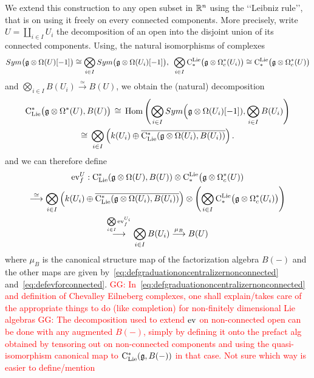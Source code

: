 \documentclass[11pt]{amsart}
\numberwithin{equation}{section}
\def\greg{\textcolor{red}{GG: }\textcolor{red}}
\begin{document}
\smallskip




We extend this construction  to any 
 open subset in $\mathbb R^n$ using the \lq\lq{}Leibniz rule\rq\rq{}, that is on using it freely on every connected components. 
 More precisely, 
  write $U=\coprod_{i\in I} U_i$ the decomposition of an open into the  disjoint union 
of its connected components. Using, the natural isomorphisms of complexes 
\[Sym\big(\mathfrak g \otimes \Omega (U)[-1]\big) 
\cong \bigotimes\limits_{i\in I} Sym\big(\mathfrak g \otimes \Omega ( U_i)[-1]\big), \mbox{  } 
\bigotimes_{i\in I} {\rm C}^{\rm Lie}_*\big(\mathfrak g \otimes \Omega_c^* (U_i)\big) \cong
{\rm C}^{\rm Lie}_*\big(\mathfrak g \otimes \Omega_c^* (U)\big)\] and
$\bigotimes_{i\in I} B(U_i) 
\stackrel{\simeq}\longrightarrow B(U)$, we obtain the 
 (natural) decomposition 
\begin{multline}\label{eq:defgraduationoncentralizernonconnected}
 {\rm C}_{\rm Lie}^*\big(\mathfrak g\otimes \Omega^*(U), B(U)\big)  \, \cong \, 
 {\rm Hom}\left(\bigotimes\limits_{i\in I} Sym\Big(\mathfrak g\otimes \Omega (U_i)[-1]), 
 \bigotimes\limits_{i\in I} B(U_i)\right) \\ \cong \, 
 \bigotimes\limits_{i\in I}\left( k(U_i) \oplus \overline{{\rm C}_{\rm Lie}^* (\mathfrak g\otimes \Omega (U_i), B(U_i))  }\right).
\end{multline}
and we can therefore define 
\begin{multline}\label{eq:defineevf}
 {\rm ev}_f^U: {\rm C}_{\rm Lie}^* (\mathfrak g\otimes \Omega (U), B(U)) \otimes {\rm C}^{\rm Lie}_*\big(\mathfrak g \otimes \Omega_c^* (U)) 
 \\ \stackrel{\simeq}\longrightarrow  
\bigotimes\limits_{i\in I}\left( k(U_i) \oplus \overline{{\rm C}_{\rm Lie}^* (\mathfrak g\otimes \Omega (U_i), B(U_i))  }\right) \otimes 
 \left(\bigotimes\limits_{i\in I}{\rm C}^{\rm Lie}_*\big(\mathfrak g \otimes \Omega_c^* (U_i)\big)\right)  \\ 
 \stackrel{\bigotimes\limits_{i\in I}{\rm ev}^{U_i}_f}\longrightarrow  
 \bigotimes\limits_{i\in I} B(U_i) \stackrel{\mu_B}\longrightarrow B(U)
\end{multline}
where $\mu_B$ is the canonical structure map of the factorization algebra $B(-)$ and the other maps are given by~\eqref{eq:defgraduationoncentralizernonconnected} 
and~\eqref{eq:defevforconnected}.
\greg{In~\eqref{eq:defgraduationoncentralizernonconnected} and definition of Chevalley Eilneberg complexes, one shall explain/takes care of the appropriate 
things to do (like completion) for non-finitely dimensional Lie algebras}
\greg{The decomposition used to extend ${\rm ev}$ on non-connected open can be done with any augmented $B(-)$, simply by defining it onto the prefact alg obtained by tensoring 
out on non-connected components and using the quasi-isomorphism canonical map to ${\rm C}_{\rm Lie}^*(\mathfrak g, B(-))$ in that case. Not sure which way is easier to define/mention}
\end{document}
